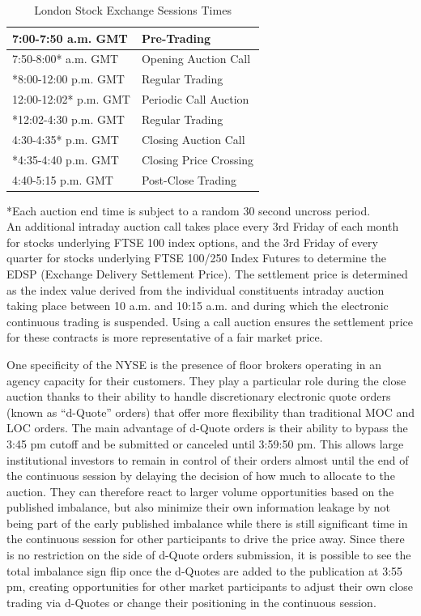 	\begin{table}[!ht]
  	\centering
   	\caption{London Stock Exchange Sessions Times\label{tab:LSEclose}}
   	\begin{tabular}{ll} 
	7:00-7:50 a.m. GMT & Pre-Trading  \\ \hline
	7:50-8:00* a.m. GMT & Opening Auction Call\\ \hline
	*8:00-12:00 p.m. GMT & Regular Trading \\ \hline
	12:00-12:02* p.m. GMT & Periodic Call Auction \\ \hline
	*12:02-4:30 p.m. GMT & Regular Trading \\ \hline
	4:30-4:35* p.m. GMT & Closing Auction Call \\ \hline
	*4:35-4:40 p.m. GMT & Closing Price Crossing \\ \hline	
	4:40-5:15 p.m. GMT & Post-Close Trading
   	\end{tabular}
	\begin{minipage}[t]{1\textwidth}
	\small{*Each auction end time is subject to a random 30 second uncross period.\\}
	\small{An additional intraday auction call takes place every 3rd Friday of each month for stocks underlying FTSE 100 index options, and the 3rd Friday of every quarter for stocks underlying FTSE 100/250 Index Futures to determine the EDSP (Exchange Delivery Settlement Price). The settlement price is determined as the index value derived from the individual constituents intraday auction taking place between 10 a.m. and 10:15 a.m. and during which the electronic continuous trading is suspended. Using a call auction ensures the settlement price for these contracts is more representative of a fair market price.}
	\end{minipage}   
	\end{table}	

One specificity of the NYSE is the presence of floor brokers operating in an agency capacity for their customers. They play a particular role during the close auction thanks to their ability to handle discretionary electronic quote orders (known as ``d-Quote'' orders) that offer more flexibility than traditional MOC and LOC orders. The main advantage of d-Quote orders is their ability to bypass the 3:45 pm cutoff and be submitted or canceled until 3:59:50 pm. This allows large institutional investors to remain in control of their orders almost until the end of the continuous session by delaying the decision of how much to allocate to the auction. They can therefore react to larger volume opportunities based on the published imbalance, but also minimize their own information leakage by not being part of the early published imbalance while there is still significant time in the continuous session for other participants to drive the price away.  Since there is no restriction on the side of d-Quote orders submission, it is possible to see the total imbalance sign flip once the d-Quotes are added to the publication at 3:55 pm, creating opportunities for other market participants to adjust their own close trading via d-Quotes or change their positioning in the continuous session. \twomedskip


